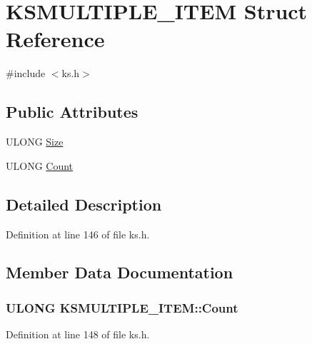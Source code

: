 \hypertarget{struct_k_s_m_u_l_t_i_p_l_e___i_t_e_m}{}\section{K\+S\+M\+U\+L\+T\+I\+P\+L\+E\+\_\+\+I\+T\+EM Struct Reference}
\label{struct_k_s_m_u_l_t_i_p_l_e___i_t_e_m}


{\ttfamily \#include $<$ks.\+h$>$}

\subsection*{Public Attributes}
\begin{DoxyCompactItemize}
\item 
U\+L\+O\+NG \hyperlink{struct_k_s_m_u_l_t_i_p_l_e___i_t_e_m_a54498b17fc44b94f5d3aa99b26310234}{Size}
\item 
U\+L\+O\+NG \hyperlink{struct_k_s_m_u_l_t_i_p_l_e___i_t_e_m_a5e51604ca38ba7ce256dae4d28396c64}{Count}
\end{DoxyCompactItemize}


\subsection{Detailed Description}


Definition at line 146 of file ks.\+h.



\subsection{Member Data Documentation}
\subsubsection[{\texorpdfstring{Count}{Count}}]{\setlength{\rightskip}{0pt plus 5cm}U\+L\+O\+NG K\+S\+M\+U\+L\+T\+I\+P\+L\+E\+\_\+\+I\+T\+E\+M\+::\+Count}\hypertarget{struct_k_s_m_u_l_t_i_p_l_e___i_t_e_m_a5e51604ca38ba7ce256dae4d28396c64}{}\label{struct_k_s_m_u_l_t_i_p_l_e___i_t_e_m_a5e51604ca38ba7ce256dae4d28396c64}


Definition at line 148 of file ks.\+h.

